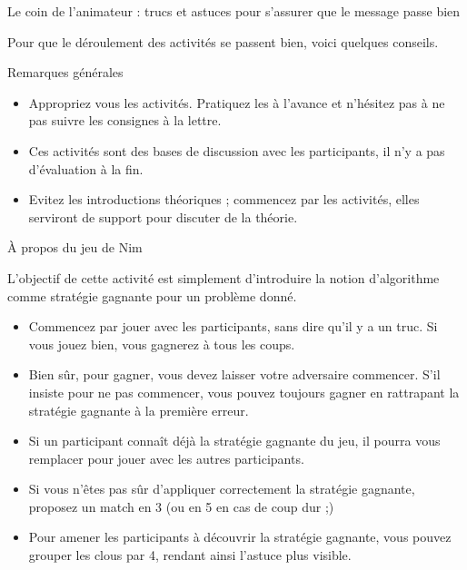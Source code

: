 \begin{frame}{Le coin de l'animateur : trucs et astuces pour s'assurer que le message passe bien}
\label{coin::animateur}

  Pour que le déroulement des activités se passent bien, voici quelques conseils.

  \begin{block}{Remarques générales}
    \begin{itemize}
    \item Appropriez vous les activités. Pratiquez les à l'avance et n'hésitez pas à ne pas suivre les consignes à la lettre.
    \item Ces activités sont des bases de discussion avec les participants, il n'y a pas d'évaluation à la fin.
    \item Evitez les introductions théoriques ; commencez par les activités, elles serviront de support pour discuter de la théorie.
    \end{itemize}
  \end{block}
  \begin{block}{À propos du jeu de Nim}

    L'objectif de cette activité est simplement d'introduire la notion d'algorithme comme stratégie gagnante pour un problème donné.
    \begin{itemize}
    \item Commencez par jouer avec les participants, sans dire qu'il y a un truc. Si vous jouez bien, vous gagnerez à tous les coups.
    \item Bien sûr, pour gagner, vous devez laisser votre adversaire commencer. S'il insiste pour ne pas commencer, vous pouvez toujours gagner en rattrapant la stratégie gagnante à la première erreur.
    \item Si un participant connaît déjà la stratégie gagnante du jeu, il pourra vous remplacer pour jouer avec les autres participants.
    \item Si vous n'êtes pas sûr d'appliquer correctement la stratégie gagnante, proposez un match en 3 (ou en 5 en cas de coup dur ;)
    \item Pour amener les participants à découvrir la stratégie gagnante, vous pouvez grouper les clous par 4, rendant ainsi l'astuce plus visible.
    \end{itemize}
  \end{block}
\end{frame}

